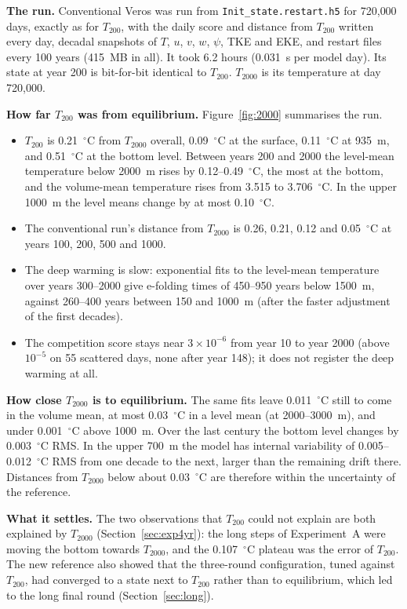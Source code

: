 \documentclass{article}
\begin{document}
\textbf{The run.} Conventional Veros was run from \texttt{Init\_state.restart.h5} for 720{,}000 days, exactly as for $T_{200}$, with the daily score and distance from $T_{200}$ written every day, decadal snapshots of $T$, $u$, $v$, $w$, $\psi$, TKE and EKE, and restart files every 100 years (415~MB in all). It took 6.2 hours (0.031~s per model day). Its state at year 200 is bit-for-bit identical to $T_{200}$. $T_{2000}$ is its temperature at day 720{,}000.

\textbf{How far $T_{200}$ was from equilibrium.} Figure~\ref{fig:2000} summarises the run.
\begin{itemize}
\item $T_{200}$ is 0.21~$^\circ$C from $T_{2000}$ overall, 0.09~$^\circ$C at the surface, 0.11~$^\circ$C at 935~m, and 0.51~$^\circ$C at the bottom level. Between years 200 and 2000 the level-mean temperature below 2000~m rises by 0.12--0.49~$^\circ$C, the most at the bottom, and the volume-mean temperature rises from 3.515 to 3.706~$^\circ$C. In the upper 1000~m the level means change by at most 0.10~$^\circ$C.
\item The conventional run's distance from $T_{2000}$ is 0.26, 0.21, 0.12 and 0.05~$^\circ$C at years 100, 200, 500 and 1000.
\item The deep warming is slow: exponential fits to the level-mean temperature over years 300--2000 give e-folding times of 450--950 years below 1500~m, against 260--400 years between 150 and 1000~m (after the faster adjustment of the first decades).
\item The competition score stays near $3\times10^{-6}$ from year 10 to year 2000 (above $10^{-5}$ on 55 scattered days, none after year 148); it does not register the deep warming at all.
\end{itemize}

\textbf{How close $T_{2000}$ is to equilibrium.} The same fits leave 0.011~$^\circ$C still to come in the volume mean, at most 0.03~$^\circ$C in a level mean (at 2000--3000~m), and under 0.001~$^\circ$C above 1000~m. Over the last century the bottom level changes by 0.003~$^\circ$C RMS. In the upper 700~m the model has internal variability of 0.005--0.012~$^\circ$C RMS from one decade to the next, larger than the remaining drift there. Distances from $T_{2000}$ below about 0.03~$^\circ$C are therefore within the uncertainty of the reference.

\textbf{What it settles.} The two observations that $T_{200}$ could not explain are both explained by $T_{2000}$ (Section~\ref{sec:exp4yr}): the long steps of Experiment~A were moving the bottom towards $T_{2000}$, and the 0.107~$^\circ$C plateau was the error of $T_{200}$. The new reference also showed that the three-round configuration, tuned against $T_{200}$, had converged to a state next to $T_{200}$ rather than to equilibrium, which led to the long final round (Section~\ref{sec:long}).
\end{document}
